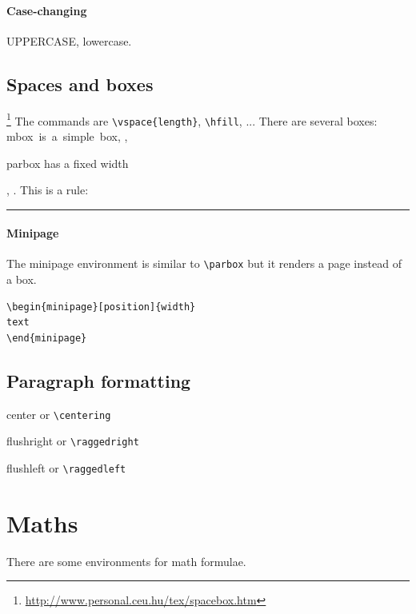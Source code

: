 \paragraph{Case-changing}
\uppercase{uppercase}, \lowercase{lowercase}.

\subsection{Spaces and boxes}
\footnote{\url{http://www.personal.ceu.hu/tex/spacebox.htm}}
The commands are \lstinline$\vspace{length}$, \lstinline$\hfill$, ...
There are several boxes:
\mbox{mbox is a simple box},
,
\parbox{2cm}{parbox has a fixed width},
.
This is a rule: \hfill \\
\rule{\linewidth}{0.3mm}

\paragraph{Minipage}
The minipage environment is similar to \lstinline$\parbox$ but it renders a page
instead of a box.

\begin{minipage}[b]{0.5\linewidth}
\begin{lstlisting}
\begin{minipage}[position]{width}
text
\end{minipage}
\end{lstlisting}
\end{minipage}

\subsection{Paragraph formatting}
\begin{center}
center or \lstinline$\centering$
\end{center}
\begin{flushright}
flushright or \lstinline$\raggedright$
\end{flushright}
\begin{flushleft}
flushleft or \lstinline$\raggedleft$
\end{flushleft}

\section{Maths}

There are some environments for math formulae.


